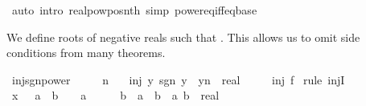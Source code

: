 \begin{isabellebody}
\isamarkupfalse%
\ {\isacharparenleft}{\kern0pt}auto\ intro{\isacharbang}{\kern0pt}{\isacharcolon}{\kern0pt}\ realpow{\isacharunderscore}{\kern0pt}pos{\isacharunderscore}{\kern0pt}nth\ simp{\isacharcolon}{\kern0pt}\ power{\isacharunderscore}{\kern0pt}eq{\isacharunderscore}{\kern0pt}iff{\isacharunderscore}{\kern0pt}eq{\isacharunderscore}{\kern0pt}base{\isacharparenright}{\kern0pt}%
\endisatagproof
{\isafoldproof}%
%
\isadelimproof
%
\endisadelimproof
%
\isadelimdocument
%
\endisadelimdocument
%
\isatagdocument
%
\isamarkuptrue%
%
\endisatagdocument
{\isafolddocument}%
%
\isadelimdocument
%
\endisadelimdocument
%
\begin{isamarkuptext}%
We define roots of negative reals such that .
  This allows us to omit side conditions from many theorems.%
\end{isamarkuptext}\isamarkuptrue%
\isamarkupfalse%
\ inj{\isacharunderscore}{\kern0pt}sgn{\isacharunderscore}{\kern0pt}power{\isacharcolon}{\kern0pt}\isanewline
\ \ \ {\isachardoublequoteopen}{}\ {\isacharless}{\kern0pt}\ n{\isachardoublequoteclose}\isanewline
\ \ \ {\isachardoublequoteopen}inj\ {\isacharparenleft}{\kern0pt}{\isasymlambda}y{\isachardot}{\kern0pt}\ sgn\ y\ {\isacharasterisk}{\kern0pt}\ {\isasymbar}y{\isasymbar}{\isacharcircum}{\kern0pt}n\ {\isacharcolon}{\kern0pt}{\isacharcolon}{\kern0pt}\ real{\isacharparenright}{\kern0pt}{\isachardoublequoteclose}\isanewline
\ \ \ \ {\isacharparenleft}{\kern0pt}\ {\isachardoublequoteopen}inj\ {\isacharquery}{\kern0pt}f{\isachardoublequoteclose}{\isacharparenright}{\kern0pt}\isanewline
%
\isadelimproof
%
\endisadelimproof
%
\isatagproof
{}\isamarkupfalse%
\ {\isacharparenleft}{\kern0pt}rule\ injI{\isacharparenright}{\kern0pt}\isanewline
\ \ \isamarkupfalse%
\ x{\isacharcolon}{\kern0pt}\ {\isachardoublequoteopen}{\isacharparenleft}{\kern0pt}{}\ {\isacharless}{\kern0pt}\ a\ {\isasymand}\ b\ {\isacharless}{\kern0pt}\ {}{\isacharparenright}{\kern0pt}\ {\isasymor}\ {\isacharparenleft}{\kern0pt}a\ {\isacharless}{\kern0pt}\ {}\ {\isasymand}\ {}\ {\isacharless}{\kern0pt}\ b{\isacharparenright}{\kern0pt}\ {\isasymLongrightarrow}\ a\ {\isasymnoteq}\ b{\isachardoublequoteclose}\ \ a\ b\ {\isacharcolon}{\kern0pt}{\isacharcolon}{\kern0pt}\ real\isanewline

\end{isabellebody}
